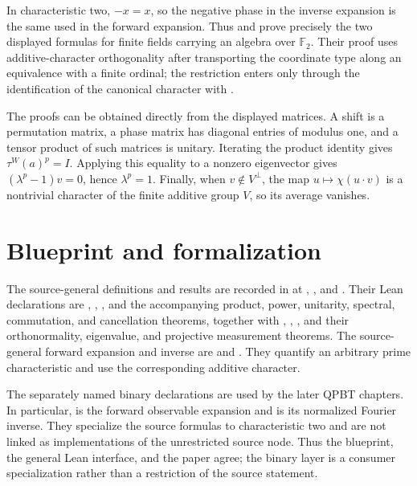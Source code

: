 \documentclass[11pt]{article}
\begin{document}
In characteristic two, $-x=x$, so the negative phase in the inverse expansion
is the same  used in the forward expansion.  Thus
 and
 prove precisely the two displayed
formulas for finite fields carrying an algebra over $\mathbb F_2$.  Their proof
uses additive-character orthogonality after transporting the coordinate type
along an equivalence with a finite ordinal; the restriction enters only through
the identification of the canonical character with .

The proofs can be obtained directly from the displayed matrices.  A shift is a
permutation matrix, a phase matrix has diagonal entries of modulus one, and a
tensor product of such matrices is unitary.  Iterating the product identity
gives $\tau^W(a)^p=I$.  Applying this equality to a nonzero eigenvector gives
$(\lambda^p-1)v=0$, hence $\lambda^p=1$.  Finally, when
$v\notin V^\perp$, the map $u\mapsto\chi(u\cdot v)$ is a nontrivial character
of the finite additive group $V$, so its average vanishes.

\section{Blueprint and formalization}
The source-general definitions and results are recorded in
 at
, , and
. Their Lean declarations are ,
, , and the accompanying
product, power, unitarity, spectral, commutation, and cancellation theorems,
together with , ,
, and their orthonormality, eigenvalue, and projective
measurement theorems.  The source-general forward expansion and inverse are
 and
.  They quantify an
arbitrary prime characteristic and use the corresponding additive character.

The separately named binary declarations are used by the later QPBT chapters.
In particular,  is the forward
observable expansion and  is its
normalized Fourier inverse.  They specialize the source formulas to
characteristic two and are not linked as implementations of the unrestricted
source node. Thus the blueprint, the general Lean interface, and the paper
agree; the binary layer is a consumer specialization rather than a restriction
of the source statement.
\end{document}
